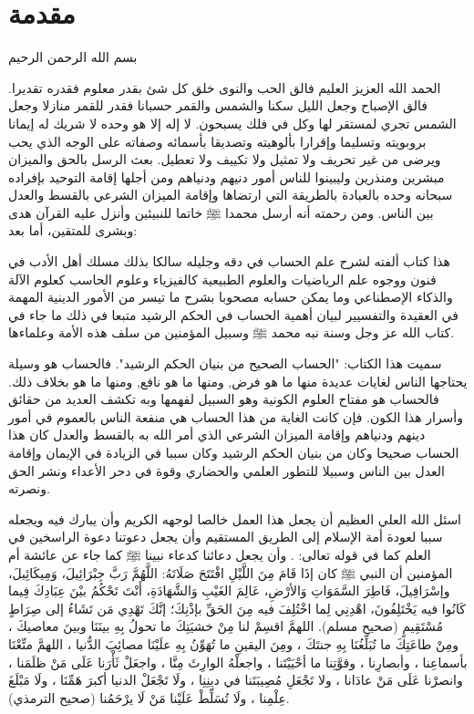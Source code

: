 \chapter{مقدمة}

\begin{center}
    بسم الله الرحمن الرحيم
\end{center}

الحمد الله العزيز العليم فالق الحب والنوى خلق كل شئ بقدر معلوم فقدره تقديرا. فالق الإصباح وجعل الليل سكنا والشمس والقمر حسبانا فقدر للقمر منازلا وجعل الشمس تجري لمستقر لها وكل في فلك يسبحون. لا إله إلا هو وحده لا شريك له  إيمانا بروبويته وتسليما وإقرارا بألوهيته وتصديقا بأسمائه وصفاته على الوجه الذي يحب ويرضى من غير تحريف ولا تمثيل ولا تكييف ولا تعطيل. بعث الرسل بالحق والميزان مبشرين ومنذرين وليبينوا للناس أمور دنيهم ودنياهم ومن أجلها إقامة التوحيد بإفراده سبحانه وحده بالعبادة بالطريقة التي ارتضاها وإقامة الميزان الشرعي بالقسط والعدل بين الناس. ومن رحمته أنه أرسل محمدا ﷺ خاتما للنبيئين وأنزل عليه القرآن هدى وبشرى للمتقين، أما بعد:

هذا كتاب ألفته لشرح علم الحساب في دقه وجليله سالكا بذلك مسلك أهل الأدب في فنون ووجوه علم الرياضيات والعلوم الطبيعية كالفيزياء وعلوم الحاسب كعلوم الآلة والذكاء الإصطناعي وما يمكن حسابه مصحوبا بشرح ما تيسر من الأمور الدينية المهمة في العقيدة والتفسيير لبيان أهمية الحساب في الحكم الرشيد متبعا في ذلك ما جاء في كتاب الله عز وجل وسنة نبه محمد ﷺ وسبيل المؤمنين من سلف هذه الأمة وعلماءها.

سميت هذا الكتاب: "الحساب الصحيح من بنيان الحكم الرشيد". فالحساب هو وسيلة يحتاجها الناس لغايات عديدة منها ما هو فرض, ومنها ما هو نافع, ومنها ما هو بخلاف ذلك. فالحساب هو مفتاح العلوم الكونية وهو السبيل لفهمها وبه تكشف العديد من حقائق وأسرار هذا الكون. فإن كانت الغاية من هذا الحساب هي منفعة الناس بالعموم في أمور دينهم ودنياهم وإقامة الميزان الشرعي الذي أمر الله به بالقسط والعدل كان هذا الحساب صحيحا وكان من بنيان الحكم الرشيد وكان سببا في الزيادة في الإيمان وإقامة العدل بين الناس وسبيلا للتطور العلمي والحضاري وقوة في دحر الأعداء ونشر الحق ونصرته.

اسئل الله العلي العظيم أن يجعل هذا العمل خالصا لوجهه الكريم وأن يبارك فيه ويجعله سببا لعودة أمة الإسلام إلى الطريق المستقيم وأن يجعل دعوتنا دعوة الراسخين في العلم كما في قوله تعالى:
\quranayah*[3][7][32]\quranayah*[3][8]{\footnotesize \surahname*[3]}. وأن يجعل دعائنا كدعاء نبينا ﷺ كما جاء عن عائشة أم المؤمنين أن النبي ﷺ كان إذَا قَامَ مِنَ اللَّيْلِ افْتَتَحَ صَلَاتَهُ: اللَّهُمَّ رَبَّ جِبْرَائِيلَ، وَمِيكَائِيلَ، وإسْرَافِيلَ، فَاطِرَ السَّمَوَاتِ وَالأرْضِ، عَالِمَ الغَيْبِ وَالشَّهَادَةِ، أَنْتَ تَحْكُمُ بيْنَ عِبَادِكَ فِيما كَانُوا فيه يَخْتَلِفُونَ، اهْدِنِي لِما اخْتُلِفَ فيه مِنَ الحَقِّ بإذْنِكَ؛ إنَّكَ تَهْدِي مَن تَشَاءُ إلى صِرَاطٍ مُسْتَقِيمٍ {\footnotesize (صحيح مسلم)}.  اللهمَّ اقسِمْ لنا مِنْ خشيَتِكَ ما تحولُ بِهِ بينَنَا وبينَ معاصيكَ ، ومِنْ طاعَتِكَ ما تُبَلِّغُنَا بِهِ جنتَكَ ، ومِنَ اليقينِ ما تُهَوِّنُ بِهِ علَيْنَا مصائِبَ الدُّنيا ، اللهمَّ متِّعْنَا بأسماعِنا ، وأبصارِنا ، وقوَّتِنا ما أحْيَيْتَنا ، واجعلْهُ الوارِثَ مِنَّا ، واجعَلْ ثَأْرَنا عَلَى مَنْ ظلَمَنا ، وانصرْنا عَلَى مَنْ عادَانا ، ولا تَجْعَلِ مُصِيبَتَنا في دينِنِا ، ولَا تَجْعَلْ الدنيا أكبرَ هَمِّنَا ، ولَا مَبْلَغَ عِلْمِنا ، ولَا تُسَلِّطْ عَلَيْنا مَنْ لَا يرْحَمُنا (صحيح الترمذي).